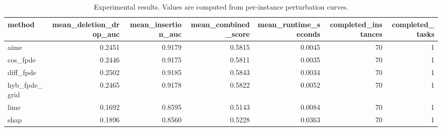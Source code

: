 \begin{table}[t]
\caption{Experimental results. Values are computed from per-instance perturbation curves.}
\label{tab:main_results_computed}
\centering
\begin{tabular}{lrrrrrr}
\toprule
method & mean\_deletion\_drop\_auc & mean\_insertion\_auc & mean\_combined\_score & mean\_runtime\_seconds & completed\_instances & completed\_tasks \\
\midrule
aime & 0.2451 & 0.9179 & 0.5815 & 0.0045 & 70 & 1 \\
cos\_fpde & 0.2446 & 0.9175 & 0.5811 & 0.0035 & 70 & 1 \\
diff\_fpde & 0.2502 & 0.9185 & 0.5843 & 0.0034 & 70 & 1 \\
hyb\_fpde\_grid & 0.2465 & 0.9178 & 0.5822 & 0.0052 & 70 & 1 \\
lime & 0.1692 & 0.8595 & 0.5143 & 0.0084 & 70 & 1 \\
shap & 0.1896 & 0.8560 & 0.5228 & 0.0363 & 70 & 1 \\
\bottomrule
\end{tabular}

\end{table}
